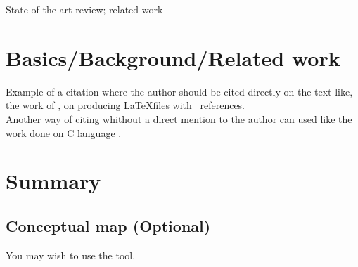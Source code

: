 State of the art review; related work

\section{Basics/Background/Related work}
Example of a citation where the author should be cited directly on the text like, the work of \cite{GRM97}, on producing \LaTeX files with \Bibtex\ references. \\
Another way of citing whithout a direct mention to the author can used like the work done on C language \citep{KeR88}.

\section{Summary}
    \subsection{Conceptual map (Optional)}
You may wish to use the  tool.
